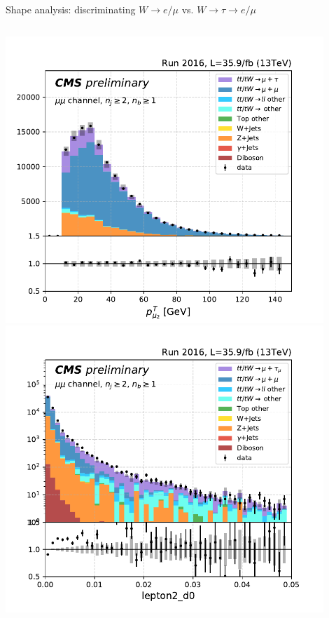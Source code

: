 \begin{frame}{\smaller Shape analysis: discriminating $W\rightarrow e/\mu$ vs. $W\rightarrow\tau\rightarrow e/\mu$}
\begin{columns}
        \begin{center}
            \includegraphics[width=0.9\textwidth]{chapters/Analysis/sectionPlots/figures/kinematics_pickles/mumu/12b/mumu_2b_lepton2_pt.pdf}
            \includegraphics[width=0.9\textwidth]{chapters/Analysis/sectionSelection/figures/sob/mumu_lepton2_d0_logscale.pdf}
        \end{center}

    \end{columns}

\end{frame}


